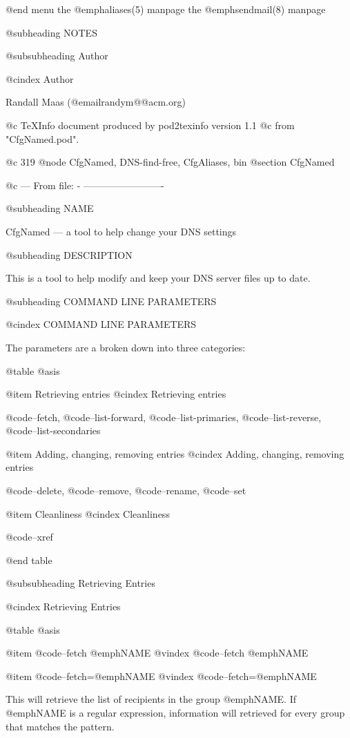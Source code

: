 @end menu
the @emph{aliases}(5) manpage
the @emph{sendmail}(8) manpage

@subheading NOTES

@subsubheading Author

@cindex Author

Randall Maas (@email{randym@@acm.org})

@c TeXInfo document produced by pod2texinfo version 1.1
@c from "CfgNamed.pod".


@c 319
@node CfgNamed, DNS-find-free, CfgAliases, bin
@section CfgNamed


@c --- From file: - -------------------------

@subheading NAME


CfgNamed --- a tool to help change your DNS settings

@subheading DESCRIPTION

This is a tool to help modify and keep your DNS server files up to date.

@subheading COMMAND LINE PARAMETERS

@cindex COMMAND LINE PARAMETERS

The parameters are a broken down into three categories:

@table @asis

@item Retrieving entries
@cindex Retrieving entries

@code{--fetch}, @code{--list-forward}, @code{--list-primaries},
@code{--list-reverse}, @code{--list-secondaries}

@item Adding, changing, removing entries
@cindex Adding, changing, removing entries

@code{--delete},
@code{--remove}, @code{--rename},
@code{--set}

@item Cleanliness
@cindex Cleanliness

@code{--xref}

@end table

@subsubheading Retrieving Entries

@cindex Retrieving Entries

@table @asis

@item @code{--fetch }@emph{NAME}
@vindex @code{--fetch }@emph{NAME}

@item @code{--fetch=}@emph{NAME}
@vindex @code{--fetch=}@emph{NAME}

This will retrieve the list of recipients in the group @emph{NAME}.  If @emph{NAME}
is a regular expression, information will retrieved for every group that matches
the pattern.

